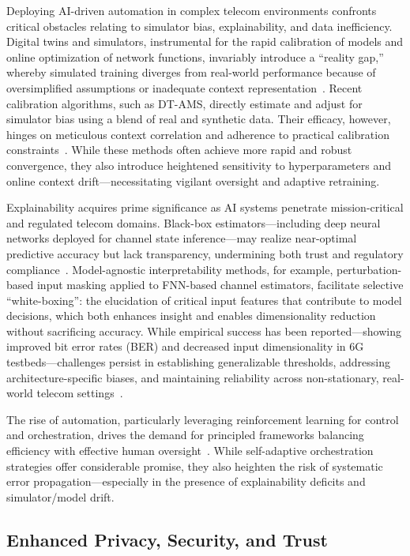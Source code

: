 Deploying AI-driven automation in complex telecom environments confronts critical obstacles relating to simulator bias, explainability, and data inefficiency. Digital twins and simulators, instrumental for the rapid calibration of models and online optimization of network functions, invariably introduce a ``reality gap,'' whereby simulated training diverges from real-world performance because of oversimplified assumptions or inadequate context representation~\cite{ref37,ref41}. Recent calibration algorithms, such as DT-AMS, directly estimate and adjust for simulator bias using a blend of real and synthetic data. Their efficacy, however, hinges on meticulous context correlation and adherence to practical calibration constraints~\cite{ref41}. While these methods often achieve more rapid and robust convergence, they also introduce heightened sensitivity to hyperparameters and online context drift---necessitating vigilant oversight and adaptive retraining.

Explainability acquires prime significance as AI systems penetrate mission-critical and regulated telecom domains. Black-box estimators---including deep neural networks deployed for channel state inference---may realize near-optimal predictive accuracy but lack transparency, undermining both trust and regulatory compliance~\cite{ref38}. Model-agnostic interpretability methods, for example, perturbation-based input masking applied to FNN-based channel estimators, facilitate selective ``white-boxing'': the elucidation of critical input features that contribute to model decisions, which both enhances insight and enables dimensionality reduction without sacrificing accuracy. While empirical success has been reported---showing improved bit error rates (BER) and decreased input dimensionality in 6G testbeds---challenges persist in establishing generalizable thresholds, addressing architecture-specific biases, and maintaining reliability across non-stationary, real-world telecom settings~\cite{ref38,ref41}.

The rise of automation, particularly leveraging reinforcement learning for control and orchestration, drives the demand for principled frameworks balancing efficiency with effective human oversight~\cite{ref37}. While self-adaptive orchestration strategies offer considerable promise, they also heighten the risk of systematic error propagation---especially in the presence of explainability deficits and simulator/model drift.

\subsection{Enhanced Privacy, Security, and Trust}

